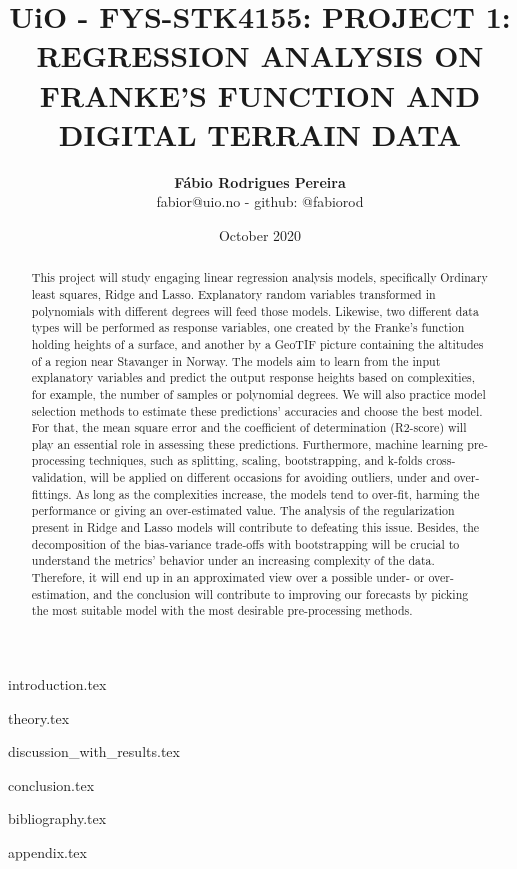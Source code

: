 \documentclass{article}
\title{UiO - FYS-STK4155: PROJECT 1: REGRESSION ANALYSIS ON FRANKE'S  FUNCTION AND DIGITAL TERRAIN DATA}
\author{\textbf{Fábio Rodrigues Pereira} \\ \small fabior@uio.no - github: @fabiorod}
\date{October 2020}
\begin{document}
\maketitle
\begin{abstract}
\noindent This project will study engaging linear regression analysis models, specifically Ordinary least squares, Ridge and Lasso. Explanatory random variables transformed in polynomials with different degrees will feed those models. Likewise, two different data types will be performed as response variables, one created by the Franke's function holding heights of a surface, and another by a GeoTIF picture containing the altitudes of a region near Stavanger in Norway. The models aim to learn from the input explanatory variables and predict the output response heights based on complexities, for example, the number of samples or polynomial degrees. We will also practice model selection methods to estimate these predictions' accuracies and choose the best model. For that, the mean square error and the coefficient of determination (R2-score) will play an essential role in assessing these predictions. Furthermore, machine learning pre-processing techniques, such as splitting, scaling, bootstrapping, and k-folds cross-validation, will be applied on different occasions for avoiding outliers, under and over-fittings. As long as the complexities increase, the models tend to over-fit, harming the performance or giving an over-estimated value. The analysis of the regularization present in Ridge and Lasso models will contribute to defeating this issue. Besides, the decomposition of the bias-variance trade-offs with bootstrapping will be crucial to understand the metrics' behavior under an increasing complexity of the data. Therefore, it will end up in an approximated view over a possible under- or over-estimation, and the conclusion will contribute to improving our forecasts by picking the most suitable model with the most desirable pre-processing methods.
\end{abstract}

\clearpage
\thispagestyle{empty}

\tableofcontents

\clearpage
\thispagestyle{empty}

{introduction.tex}

{theory.tex}

{discussion_with_results.tex}

{conclusion.tex}

{bibliography.tex}

{appendix.tex}
\end{document}
